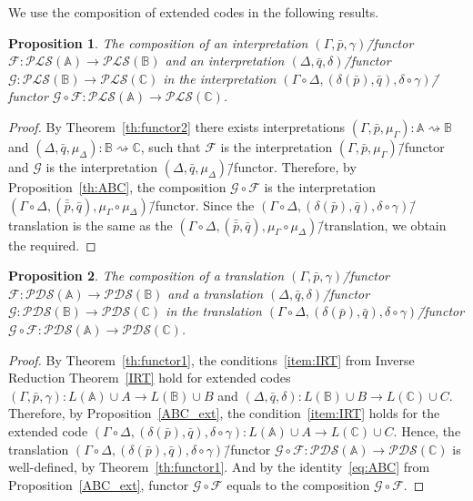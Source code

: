 \documentclass[12pt]{article}
\newtheorem{proposition}{Proposition}
\theoremstyle{definition}
\def\MA{{\mathbb{A}}}
\def\MB{{\mathbb{B}}}
\def\MC{{\mathbb{C}}}
\def\F{{\mathcal{F}}}
\def\G{{\mathcal{G}}}
\def\PLS{{\mathcal{PLS}}}
\def\PDS{{\mathcal{PDS}}}
\begin{document}
We use the composition of extended codes in the following results.

\begin{proposition}\label{prop:comp1}
The composition of an interpretation $(\Gamma,\bar p,\gamma)$\=/functor $\F\colon\PLS(\MA)\to\PLS(\MB)$ and an interpretation $(\Delta,\bar q,\delta)$\=/functor  $\G\colon\PLS(\MB)\to \PLS(\MC)$ in the interpretation $(\Gamma\circ\Delta,(\delta(\bar p),\bar q),\delta\circ\gamma)$\=/functor $\G\circ\F\colon \PLS(\MA)\to \PLS(\MC)$. 
\end{proposition}

\begin{proof}
By Theorem~\ref{th:functor2} there exists interpretations $(\Gamma,\bar p, \mu_\Gamma)\colon\MA\rightsquigarrow\MB$ and $(\Delta,\bar q, \mu_\Delta)\colon\MB\rightsquigarrow\MC$, such that $\F$ is the interpretation $(\Gamma,\bar p, \mu_\Gamma)$\=/functor and $\G$ is the interpretation $(\Delta,\bar q, \mu_\Delta)$\=/functor. Therefore, by Proposition~\ref{th:ABC}, the composition $\G\circ\F$ is the interpretation $(\Gamma\circ\Delta,(\bar{\bar p},\bar q),\mu_{\Gamma}\circ\mu_{\Delta})$\=/functor. Since the $(\Gamma\circ\Delta,(\delta(\bar p),\bar q),\delta\circ\gamma)$\=/translation is the same as the $(\Gamma\circ\Delta,(\bar{\bar p},\bar q),\mu_{\Gamma}\circ\mu_{\Delta})$\=/translation, we obtain the required. 
\end{proof}

\begin{proposition}\label{prop:comp2}
The composition of a translation $(\Gamma,\bar p,\gamma)$\=/functor $\F\colon\PDS(\MA)\to\PDS(\MB)$ and a translation $(\Delta,\bar q,\delta)$\=/functor  $\G\colon\PDS(\MB)\to \PDS(\MC)$ in the translation $(\Gamma\circ\Delta,(\delta(\bar p),\bar q),\delta\circ\gamma)$\=/functor $\G\circ\F\colon \PDS(\MA)\to \PDS(\MC)$. 
\end{proposition}

\begin{proof}
By Theorem~\ref{th:functor1}, the conditions~\ref{item:IRT} from Inverse Reduction Theorem~\ref{IRT} hold for extended codes $(\Gamma,\bar p,\gamma)\colon L(\MA)\cup A\to L(\MB)\cup B$ and $(\Delta,\bar q,\delta)\colon L(\MB)\cup B \to L(\MC)\cup C$. Therefore, by Proposition~\ref{ABC_ext}, the condition~\ref{item:IRT} holds for the extended code $(\Gamma\circ\Delta,(\delta(\bar p),\bar q),\delta\circ\gamma)\colon L(\MA)\cup A\to L(\MC)\cup C$. Hence, the translation $(\Gamma\circ\Delta,(\delta(\bar p),\bar q),\delta\circ\gamma)$\=/functor $\G\circ\F\colon \PDS(\MA)\to \PDS(\MC)$ is well-defined, by Theorem~\ref{th:functor1}. And by the identity~\eqref{eq:ABC} from Proposition~\ref{ABC_ext}, functor $\G\circ\F$ equals to the composition $\G\circ\F$.
\end{proof}
\end{document}
